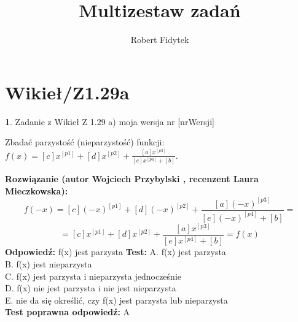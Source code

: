 \documentclass[12pt, a4paper]{article}
\title{Multizestaw zadań}
\author{Robert Fidytek}
\date{}
\theoremstyle{definition} %
\newtheorem{zad}{}
\newcommand{\kategoria}[1]{\section{#1}} %
\newcommand{\zadStart}[1]{\begin{zad}#1\newline} %
\newcommand{\zadStop}{\end{zad}}   %
\newcommand{\rozwStart}[2]{\noindent \textbf{Rozwiązanie (autor #1 , recenzent #2): }\newline} %
\newcommand{\rozwStop}{\newline}                                            %
\newcommand{\odpStart}{\noindent \textbf{Odpowiedź:}\newline}    %
\newcommand{\odpStop}{\newline}                                             %
\newcommand{\testStart}{\noindent \textbf{Test:}\newline} %
\newcommand{\testStop}{\newline} %
\newcommand{\kluczStart}{\noindent \textbf{Test poprawna odpowiedź:}\newline} %
\newcommand{\kluczStop}{\newline} %
\begin{document}
\maketitle


\kategoria{Wikieł/Z1.29a}
\zadStart{Zadanie z Wikieł Z 1.29 a) moja wersja nr [nrWersji]}

Zbadać parzystość (nieparzystość) funkcji:\\ $ f(x)=[c]x^{[p1]}+[d]x^{[p2]}+\frac{[a]x^{[p3]}}{[e]x^{[p4]}+[b]} $.
\zadStop
\rozwStart{Wojciech Przybylski}{Laura Mieczkowska}
$$f(-x)=[c](-x)^{[p1]}+[d](-x)^{[p2]}+\frac{[a](-x)^{[p3]}}{[e](-x)^{[p4]}+[b]}=$$
$$=[c]x^{[p1]}+[d]x^{[p2]}+\frac{[a]x^{[p3]}}{[e]x^{[p4]}+[b]}=f(x) $$
\rozwStop
\odpStart
f(x) jest parzysta
\odpStop
\testStart
A. f(x) jest parzysta\\
B. f(x) jest nieparzysta\\
C. f(x) jest parzysta i nieparzysta jednocześnie\\
D. f(x) nie jest parzysta i nie jest nieparzysta\\
E. nie da się określić, czy f(x) jest parzysta lub nieparzysta\\
\testStop
\kluczStart
A
\kluczStop
\end{document}
